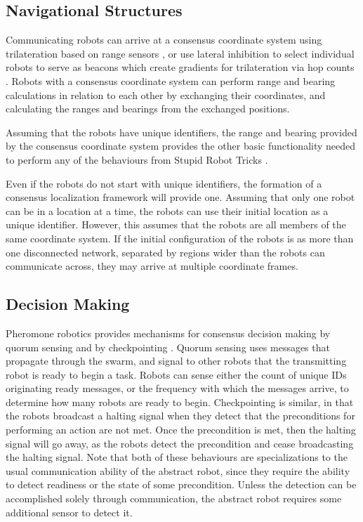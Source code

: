 \documentclass[]{article}
\begin{document}
\subsection{Navigational Structures} \label{pheremone_nav_struct}

Communicating robots can arrive at a consensus coordinate system using trilateration based on range sensors \cite{cheng2005robust}, or use lateral inhibition to select individual robots to serve as beacons which create gradients for trilateration via hop counts \cite{nagpal1999organizing}.
Robots with a consensus coordinate system can perform range and bearing calculations in relation to each other by exchanging their coordinates, and calculating the ranges and bearings from the exchanged positions. 

Assuming that the robots have unique identifiers, the range and bearing provided by the consensus coordinate system provides the other basic functionality needed to perform any of the behaviours from Stupid Robot Tricks \cite{mclurkin2004stupid}.

Even if the robots do not start with unique identifiers, the formation of a consensus localization framework will provide one.
Assuming that only one robot can be in a location at a time, the robots can use their initial location as a unique identifier. 
However, this assumes that the robots are all members of the same coordinate system.
If the initial configuration of the robots is as more than one disconnected network, separated by regions wider than the robots can communicate across, they may arrive at multiple coordinate frames.

\subsection{Decision Making}

Pheromone robotics provides mechanisms for consensus decision making by quorum sensing and by checkpointing \cite{nagpal2004catalog}. 
Quorum sensing uses messages that propagate through the swarm, and signal to other robots that the transmitting robot is ready to begin a task. 
Robots can sense either the count of unique IDs originating ready messages, or the frequency with which the messages arrive, to determine how many robots are ready to begin. 
Checkpointing is similar, in that the robots broadcast a halting signal when they detect that the preconditions for performing an action are not met.
Once the precondition is met, then the halting signal will go away, as the robots detect the precondition and cease broadcasting the halting signal. 
Note that both of these behaviours are specializations to the usual communication ability of the abstract robot, since they require the ability to detect readiness or the state of some precondition. 
Unless the detection can be accomplished solely through communication, the abstract robot requires some additional sensor to detect it. 
\end{document}
